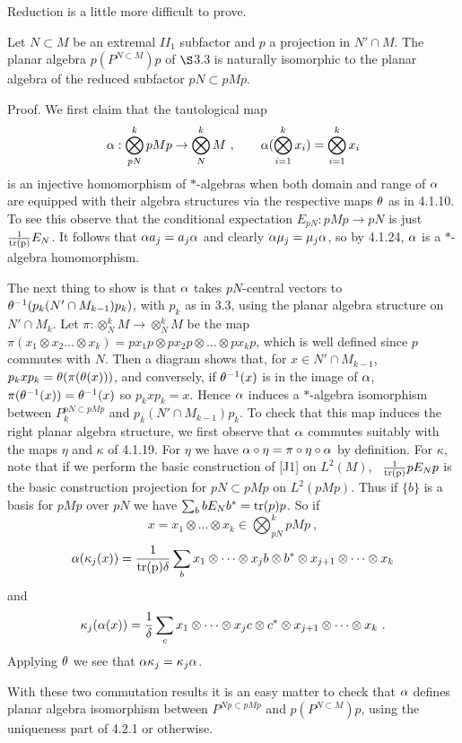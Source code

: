 \bs Reduction is a little more difficult to prove.

\bigskip
{} Let $N\subset M$ be an extremal $II_1$
subfactor and $p$ a projection in $N'\cap M$. The planar algebra
$p(P^{N\subset M})p$ of $\S$3.3 is naturally isomorphic to the
planar algebra of the reduced subfactor
$pN\subset pMp$.

\bigskip
{\sc Proof.}  We first claim that the tautological map
$$
\alpha:\bigotimes^k_{pN} pMp\to\bigotimes^k_N M \ , \qquad
\alpha(\bigotimes^k_{i=1} x_i)=\bigotimes^k_{i=1} x_i
$$
is an injective homomorphism of $*$-algebras when both domain and
range of $\alpha$ are equipped with their algebra structures via the
respective maps $\theta$ as in 4.1.10. To see this observe that the
conditional expectation $E_{pN}: pMp\to pN$ is just
$\frac{1}{\bf\rm{tr}(p)} E_N$. It follows that
$\alpha a_j=a_j\alpha$ and clearly $\alpha\mu_j=\mu_j\alpha$, so by 4.1.24,  $\alpha$
is a $*$-algebra homomorphism.

The next thing to show is that $\alpha$ takes $pN$-central vectors to
$\theta^{-1}(p_k(N'\cap M_{k-1})p_k)$, with $p_k$ as in 3.3, using
the planar algebra structure on $N'\cap M_k$. Let
$\pi:\otimes^k_NM\to \otimes^k_N M$ be the map
$\pi(x_1\otimes x_2\dots\otimes x_k)=px_1p\otimes px_2p
\otimes \dots\otimes px_kp$, which is well defined since $p$
commutes with $N$. Then a diagram shows that, for
$x\in N'\cap M_{k-1}$,
$p_kxp_k=\theta(\pi(\theta(x)))$, and conversely, if
$\theta^{-1}(x)$ is in the image of $\alpha$,
$\pi(\theta^{-1}(x))=\theta^{-1}(x)$ so $p_kxp_k=x$. Hence $\alpha$ induces
a $*$-algebra isomorphism between $P_k^{pN\subset pMp}$ and
$p_k(N'\cap M_{k-1})p_k$. To check that this map induces the
right planar algebra structure, we first observe that $\alpha$
commutes suitably with the maps $\eta$ and $\kappa$ of 4.1.19.
For $\eta$ we have $\alpha\circ\eta=\pi\circ\eta\circ\alpha$ by
definition. For $\kappa$, note that if we perform the basic
construction of [J1] on $L^2(M)$, \
$\frac{1}{\bf\rm{tr}(p)} pE_Np$ is the basic construction projection
for $pN\subset pMp$ on $L^2(pMp)$. Thus if $\{b\}$ is a basis for
$pMp$ over $pN$ we have
$\sum_b bE_N b^*={\bf\rm{tr}}(p)p$. So if
$$
x=x_1\otimes \dots\otimes x_k\in \bigotimes^k_{pN} pMp \ ,
$$
$$
\alpha(\kappa_j(x))=\frac{1}{\bf\rm{tr}(p)\delta} \sum_b
x_1\otimes \dots\otimes x_j
b\otimes b^*\otimes x_{j+1}\otimes\dots\otimes x_k
$$
and
$$
\kappa_j(\alpha(x))=\frac 1{\delta} \sum_c
x_1\otimes \dots\otimes x_j
c\otimes c^*\otimes x_{j+1}\otimes\dots\otimes x_k \ .
$$
Applying $\theta$ we see that $\alpha \kappa_j=\kappa_j\alpha$.

With these two commutation results it is an easy matter to check
that $\alpha$ defines planar algebra isomorphism between
$P^{Np\subset pMp}$ and $p(P^{N\subset M})p$, using the uniqueness
part of 4.2.1 or otherwise.

